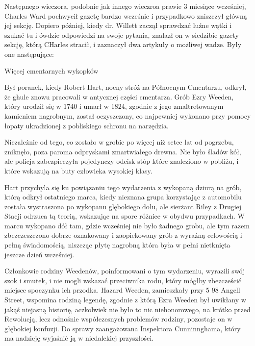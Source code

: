 Następnego wieczora, podobnie jak innego wieczroa prawie 3 miesiące wcześniej, Charles Ward pochwycił gazetę bardzo wcześnie i przypadkowo zniszczył główną jej sekcję. Dopiero później, kiedy dr. Willett zaczął sprawdzać luźne wątki i szukać tu i ówdzie odpowiedzi na swoje pytania, znalazł on w siedzibie gazety sekcję, którą CHarles stracił, i zaznaczył dwa artykuły o możliwej wadze. Były one następujące: 

\begin{displayquote}

\begin{center}
Więcej cmentarnych wykopków
\end{center}

Był poranek, kiedy Robert Hart, nocny stróż na Północnym Cmentarzu, odkrył, że ghule znowu pracowali w antycznej części cmentarza. Grób Ezry Weeden, który urodził się w 1740 i umarł w 1824, zgodnie z jego zmaltretowanym kamieniem nagrobnym, został oczyszczony, co najpewniej wykonano przy pomocy łopaty ukradzionej z pobliskiego schronu na narzędzia. 

Niezależnie od tego, co zostało w grobie po więcej niż setce lat od pogrzebu, zniknęło, poza paroma odpryskami zmartwiałego drewna. Nie było śladów kół, ale policja zabezpieczyła pojedynczy odcisk stóp które znaleziono w pobliżu, i które wskazują na buty człowieka wysokiej klasy. 

Hart przychyla się ku powiązaniu tego wydarzenia z wykopaną dziurą na grób, którą odkrył ostatniego marca, kiedy nieznana grupa korzystając z automobilu została wystraszona po wykopanu glębokiego dołu, ale sierżant Riley z Drugiej Stacji odrzuca tą teorią, wskazując na spore różnice w obydwu przypadkach. W marcu wykopano dół tam, gdzie wcześniej nie było żadnego grobu, ale tym razem zbezczeszczono dobrze oznakowany i zaopiekowany grób z wyraźną celowością i pełną świadomością, niszcząc płytę nagrobną która była w pełni nietknięta jeszcze dzień wcześniej.  

Członkowie rodziny Weedenów, poinformowani o tym wydarzeniu, wyrazili swój szok i smutek, i nie mogli wskazać przeciwnika rodu, który mógłby zbezcześcić miejsce spoczynku ich przodka. Hazard Weeden, zamieszkały przy 5 98 Angell Street, wspomina rodziną legendę, zgodnie z którą Ezra Weeden był uwikłany w jakąś niejasną historię, aczkolwiek nie było to nic niehonorowego, na krótko przed Rewolucją, lecz odnośnie współczesnych problemów rodziny, pozostaje on w głębokiej konfuzji. Do sprawy zaangażowana Inspektora Cunninnghama, który ma nadzieję wyjaśnić ją w niedalekiej przyszłości. 


\end{displayquote}
